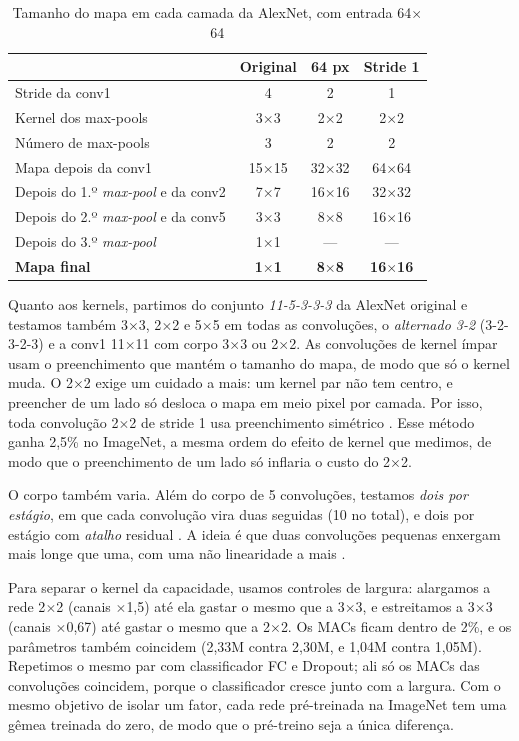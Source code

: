 \documentclass[conference]{IEEEtran}
\newcommand{\by}{\ensuremath{\times}}
\begin{document}
\begin{table}[!t]
\caption{Tamanho do mapa em cada camada da AlexNet, com entrada 64\by64}
\label{tab:arquitetura}
\centering
\footnotesize
\setlength{\tabcolsep}{3pt}
\begin{tabular}{@{}lccc@{}}
\toprule
 & \textbf{Original} & \textbf{64 px} & \textbf{Stride 1} \\
\midrule
Stride da conv1 & 4 & 2 & 1 \\
Kernel dos max-pools & 3\by3 & 2\by2 & 2\by2 \\
Número de max-pools & 3 & 2 & 2 \\
\midrule
Mapa depois da conv1 & 15\by15 & 32\by32 & 64\by64 \\
Depois do 1.º \textit{max-pool} e da conv2 & 7\by7 & 16\by16 & 32\by32 \\
Depois do 2.º \textit{max-pool} e da conv5 & 3\by3 & 8\by8 & 16\by16 \\
Depois do 3.º \textit{max-pool} & 1\by1 & --- & --- \\
\midrule
\textbf{Mapa final} & \textbf{1\by1} & \textbf{8\by8} & \textbf{16\by16} \\
\bottomrule
\end{tabular}
\end{table}

Quanto aos kernels, partimos do conjunto \textit{11-5-3-3-3} da AlexNet original e testamos também 3\by3, 2\by2 e 5\by5 em todas as
convoluções, o \textit{alternado 3-2} (3-2-3-2-3) e a conv1 11\by11 com corpo 3\by3 ou 2\by2. As convoluções de kernel ímpar usam o
preenchimento que mantém o tamanho do mapa, de modo que só o kernel muda. O 2\by2 exige um cuidado a mais: um kernel par não tem
centro, e preencher de um lado só desloca o mapa em meio pixel por camada. Por isso, toda convolução 2\by2 de stride 1 usa
preenchimento simétrico \cite{wu2019convolution}. Esse método ganha 2,5\% no ImageNet, a mesma ordem do efeito de kernel que medimos,
de modo que o preenchimento de um lado só inflaria o custo do 2\by2.

O corpo também varia. Além do corpo de 5 convoluções, testamos \textit{dois por estágio}, em que cada convolução vira duas seguidas
(10 no total), e dois por estágio com \textit{atalho} residual \cite{he2016deep}. A ideia é que duas convoluções pequenas enxergam mais
longe que uma, com uma não linearidade a mais \cite{simonyan2015very}.

Para separar o kernel da capacidade, usamos controles de largura: alargamos a rede 2\by2 (canais \by1,5) até ela gastar o mesmo que a
3\by3, e estreitamos a 3\by3 (canais \by0,67) até gastar o mesmo que a 2\by2. Os MACs ficam dentro de 2\%, e os parâmetros também
coincidem (2,33M contra 2,30M, e 1,04M contra 1,05M). Repetimos o mesmo par com classificador FC e Dropout; ali só os MACs das
convoluções coincidem, porque o classificador cresce junto com a largura. Com o mesmo objetivo de isolar um fator, cada rede pré-treinada na ImageNet tem
uma gêmea treinada do zero, de modo que o pré-treino seja a única diferença.
\end{document}

